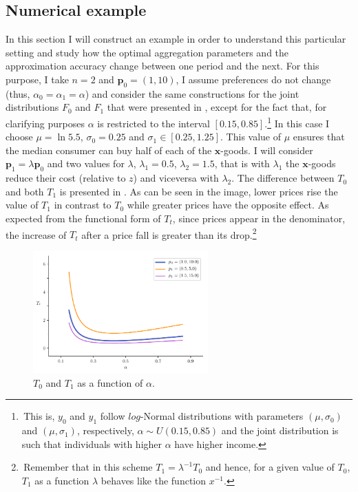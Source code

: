 \documentclass[english, a4paper, 12pt]{article}
\begin{document}
\subsection{Numerical example} \label{ssec:Category-Example}
In this section I will construct an example in order to understand this particular setting and study how the optimal aggregation parameters and the approximation accuracy change between one period and the next. For this purpose, I take $n = 2$ and $\mathbf{p}_{0} = (1,10)$, I assume preferences do not change (thus, $\alpha_{0} = \alpha_{1} = \alpha$) and consider the same constructions for the joint distributions $F_{0}$ and $F_{1}$ that were presented in , except for the fact that, for clarifying purposes $\alpha$ is restricted to the interval $[0.15, 0.85]$.\footnote{\,This is, $y_{0}$ and $y_{1}$ follow $log$-Normal distributions with parameters $(\mu, \sigma_{0})$ and $(\mu, \sigma_{1})$, respectively, $\alpha \sim U(0.15, 0.85)$ and the joint distribution is such that individuals with higher $\alpha$ have higher income.} In this case I choose $\mu = \ln 5.5$, $\sigma_{0} = 0.25$ and $\sigma_{1} \in [0.25, 1.25]$. This value of $\mu$ ensures that the median consumer can buy half of each of the $\mathbf{x}$-goods.  I will consider $\mathbf{p}_{1} = \lambda\mathbf{p}_{0}$ and two values for $\lambda$, $\lambda_{1} = 0.5$, $\lambda_{2} = 1.5$, that is with $\lambda_{1}$ the $\mathbf{x}$-goods reduce their cost (relative to $z$) and viceversa with $\lambda_{2}$. The difference between $T_{0}$ and both $T_{1}$ is presented in . As can be seen in the image, lower prices rise the value of $T_{1}$ in contrast to $T_{0}$ while greater prices have the opposite effect. As expected from the functional form of $T_{t}$, since prices appear in the denominator, the increase of $T_{t}$ after a price fall is greater than its drop.\footnote{\,Remember that in this scheme $T_{1} = \lambda^{-1}T_{0}$ and hence, for a given value of $T_{0}$, $T_{1}$ as a function $\lambda$ behaves like the function $x^{-1}$.}
	\begin{figure}[H]
		\caption{$T_{0}$ and $T_{1}$ as a function of $\alpha$.}
		\label{fig:DiffTtLambda}
		\includegraphics[width = 0.6\textwidth]{TtLambdas}
	\end{figure}
\end{document}
